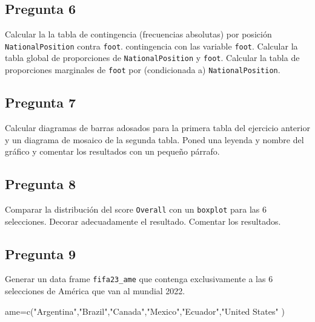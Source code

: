\documentclass[
]{article}
\newenvironment{Shaded}{\begin{snugshade}}{\end{snugshade}}
\newcommand{\FunctionTok}[1]{\textcolor[rgb]{0.00,0.00,0.00}{#1}}
\newcommand{\NormalTok}[1]{#1}
\newcommand{\OtherTok}[1]{\textcolor[rgb]{0.56,0.35,0.01}{#1}}
\newcommand{\StringTok}[1]{\textcolor[rgb]{0.31,0.60,0.02}{#1}}
\begin{document}
\hypertarget{pregunta-6}{%
\subsection{Pregunta 6}\label{pregunta-6}}

Calcular la la tabla de contingencia (frecuencias absolutas) por
posición \texttt{NationalPosition} contra \texttt{foot}. contingencia
con las variable \texttt{foot}. Calcular la tabla global de proporciones
de \texttt{NationalPosition} y \texttt{foot}. Calcular la tabla de
proporciones marginales de \texttt{foot} por (condicionada a)
\texttt{NationalPosition}.

\hypertarget{pregunta-7}{%
\subsection{Pregunta 7}\label{pregunta-7}}

Calcular diagramas de barras adosados para la primera tabla del
ejercicio anterior y un diagrama de mosaico de la segunda tabla. Poned
una leyenda y nombre del gráfico y comentar los resultados con un
pequeño párrafo.

\hypertarget{pregunta-8}{%
\subsection{Pregunta 8}\label{pregunta-8}}

Comparar la distribución del score \texttt{Overall} con un
\texttt{boxplot} para las 6 selecciones. Decorar adecuadamente el
resultado. Comentar los resultados.

\hypertarget{pregunta-9}{%
\subsection{Pregunta 9}\label{pregunta-9}}

Generar un data frame \texttt{fifa23\_ame} que contenga exclusivamente a
las 6 selecciones de América que van al mundial 2022.

\begin{Shaded}
\begin{Highlighting}[]
\NormalTok{ame}\OtherTok{=}\FunctionTok{c}\NormalTok{(}\StringTok{"Argentina"}\NormalTok{,}\StringTok{"Brazil"}\NormalTok{,}\StringTok{"Canada"}\NormalTok{,}\StringTok{"Mexico"}\NormalTok{,}\StringTok{"Ecuador"}\NormalTok{,}\StringTok{"United States"}\NormalTok{ )}
\end{Highlighting}
\end{Shaded}
\end{document}
